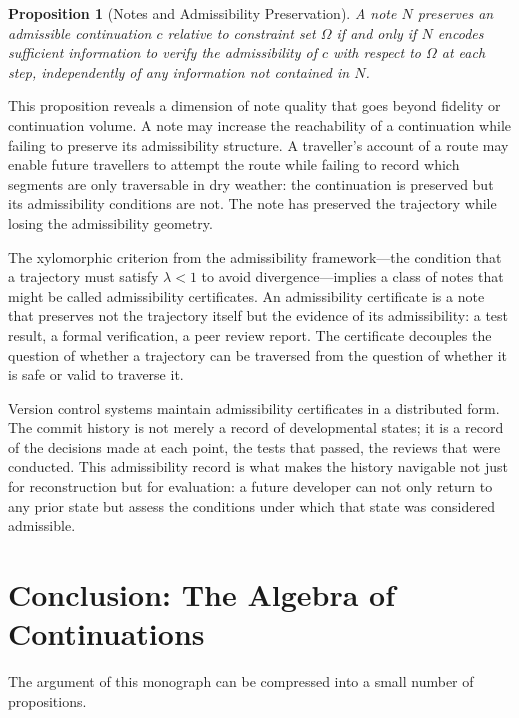 \documentclass[12pt, a4paper]{article}
\theoremstyle{plain}
\newtheorem{proposition}[theorem]{Proposition}
\theoremstyle{definition}
\theoremstyle{remark}
\begin{document}
\begin{proposition}[Notes and Admissibility Preservation]
A note $N$ preserves an admissible continuation $c$ relative to constraint set
$\Omega$ if and only if $N$ encodes sufficient information to verify the
admissibility of $c$ with respect to $\Omega$ at each step, independently of
any information not contained in $N$.
\end{proposition}

This proposition reveals a dimension of note quality that goes beyond fidelity or
continuation volume. A note may increase the reachability of a continuation while
failing to preserve its admissibility structure. A traveller's account of a route
may enable future travellers to attempt the route while failing to record which
segments are only traversable in dry weather: the continuation is preserved but
its admissibility conditions are not. The note has preserved the trajectory while
losing the admissibility geometry.

The xylomorphic criterion from the admissibility framework---the condition that a
trajectory must satisfy $\lambda < 1$ to avoid divergence---implies a class of
notes that might be called admissibility certificates. An admissibility certificate
is a note that preserves not the trajectory itself but the evidence of its
admissibility: a test result, a formal verification, a peer review report. The
certificate decouples the question of whether a trajectory can be traversed from
the question of whether it is safe or valid to traverse it.

Version control systems maintain admissibility certificates in a distributed form.
The commit history is not merely a record of developmental states; it is a record
of the decisions made at each point, the tests that passed, the reviews that were
conducted. This admissibility record is what makes the history navigable not just
for reconstruction but for evaluation: a future developer can not only return to
any prior state but assess the conditions under which that state was considered
admissible.

\section{Conclusion: The Algebra of Continuations}

The argument of this monograph can be compressed into a small number of
propositions.
\end{document}
